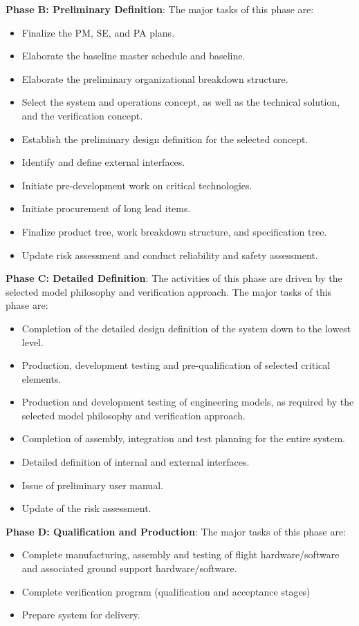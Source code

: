 \textbf{Phase B: Preliminary Definition}: The major tasks of this phase are:
\begin{itemize}
\item Finalize the PM, SE, and PA plans.
\item Elaborate the baseline master schedule and baseline.
\item Elaborate the preliminary organizational breakdown structure.
\item Select the system and operations concept, as well as the technical solution, and the verification concept.
\item Establish the preliminary design definition for the selected concept.
\item Identify and define external interfaces.
\item Initiate pre-development work on critical technologies.
\item Initiate procurement of long lead items.
\item Finalize product tree, work breakdown structure, and specification tree.
\item Update risk assessment and conduct reliability and safety assessment.
\end{itemize}

\textbf{Phase C: Detailed Definition}: The activities of this phase are driven by the selected model philosophy and verification approach. The major tasks of this phase are:
\begin{itemize}
\item Completion of the detailed design definition of the system down to the lowest level.
\item Production, development testing and pre-qualification of selected critical elements.
\item Production and development testing of engineering models, as required
by the selected model philosophy and verification approach.
\item Completion of assembly, integration and test planning for the entire system.
\item Detailed definition of internal and external interfaces.
\item Issue of preliminary user manual.
\item Update of the risk assessment.
\end{itemize}

\textbf{Phase D: Qualification and Production}: The major tasks of this phase are:
\begin{itemize}
\item Complete manufacturing, assembly and testing of flight hardware/software and associated ground support hardware/software.
\item Complete verification program (qualification and acceptance stages)
\item Prepare system for delivery.
\end{itemize}

